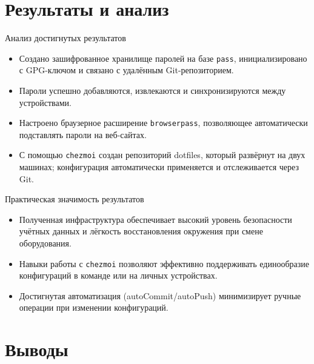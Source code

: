 \documentclass[
  ignorenonframetext,
  aspectratio=169,
  russian,
  aspectratio=169]{beamer}
\providecommand{\tightlist}{%
  \setlength{\itemsep}{0pt}\setlength{\parskip}{0pt}}
\begin{document}
\section{Результаты и
анализ}\label{ux440ux435ux437ux443ux43bux44cux442ux430ux442ux44b-ux438-ux430ux43dux430ux43bux438ux437}

\begin{frame}[fragile]{Анализ достигнутых результатов}
\protect{}\label{ux430ux43dux430ux43bux438ux437-ux434ux43eux441ux442ux438ux433ux43dux443ux442ux44bux445-ux440ux435ux437ux443ux43bux44cux442ux430ux442ux43eux432}
\begin{itemize}[<+->]
\tightlist
\item
  Создано зашифрованное хранилище паролей на базе \texttt{pass},
  инициализировано с GPG-ключом и связано с удалённым Git-репозиторием.
\item
  Пароли успешно добавляются, извлекаются и синхронизируются между
  устройствами.
\item
  Настроено браузерное расширение \texttt{browserpass}, позволяющее
  автоматически подставлять пароли на веб-сайтах.
\item
  С помощью \texttt{chezmoi} создан репозиторий dotfiles, который
  развёрнут на двух машинах; конфигурация автоматически применяется и
  отслеживается через Git.
\end{itemize}
\end{frame}

\begin{frame}[fragile]{Практическая значимость результатов}
\protect{}\label{ux43fux440ux430ux43aux442ux438ux447ux435ux441ux43aux430ux44f-ux437ux43dux430ux447ux438ux43cux43eux441ux442ux44c-ux440ux435ux437ux443ux43bux44cux442ux430ux442ux43eux432}
\begin{itemize}[<+->]
\tightlist
\item
  Полученная инфраструктура обеспечивает высокий уровень безопасности
  учётных данных и лёгкость восстановления окружения при смене
  оборудования.
\item
  Навыки работы с \texttt{chezmoi} позволяют эффективно поддерживать
  единообразие конфигураций в команде или на личных устройствах.
\item
  Достигнутая автоматизация (autoCommit/autoPush) минимизирует ручные
  операции при изменении конфигураций.
\end{itemize}
\end{frame}

\section{Выводы}\label{ux432ux44bux432ux43eux434ux44b}
\end{document}
